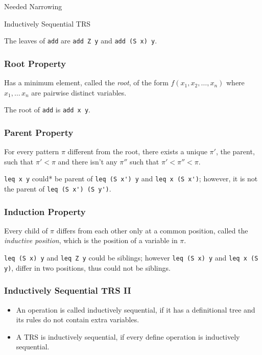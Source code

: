 \documentclass{beamer}
\begin{document}
\begin{section}{Needed Narrowing}
\begin{subsection}{Inductively Sequential TRS}
\begin{frame}
\begin{example}
  The leaves of \verb|add| are \verb|add Z y| and \verb|add (S x) y|.
\end{example}
\end{frame}
\begin{frame}
[fragile]
\frametitle{Root Property}
Has a minimum element, called the \textit{root}, of the form $f(x_1,x_2,\ldots,x_n)$ where $x_1,\ldots\,x_n$ are pairwise distinct variables.

\begin{example}
The root of \verb|add| is \verb|add x y|.

\end{example}
\end{frame}
\begin{frame}
[fragile]
  \frametitle{Parent Property} For every pattern $\pi$ different from the root, there exists a unique $\pi'$, the parent, such that $\pi' < \pi$ and there isn't any $\pi''$ such that $\pi' < \pi'' < \pi$.

\begin{example}
  \verb|leq x y| could* be parent of \verb|leq (S x') y| and \verb|leq x (S x')|; however, it is not the parent of \verb|leq (S x') (S y')|.
\end{example}
\end{frame}
\begin{frame}
[fragile]
\frametitle{Induction Property} Every child of $\pi$ differs from each other only at a common position, called the \textit{inductive position}, which is the position of a variable in $\pi$.

\begin{example}
\verb|leq (S x) y| and \verb|leq Z y| could be siblings; however \verb|leq (S x) y| and \verb|leq x (S y)|, differ in two positions, thus could not be siblings.
\end{example}

\end{frame}
\begin{frame}
\frametitle{Inductively Sequential TRS II}
\begin{itemize}
\item An operation is called inductively sequential, if it has a definitional tree and its rules do not contain extra variables.
\item A TRS is inductively sequential, if every define operation is inductively sequential. 
\end{itemize}
\end{frame}


\end{subsection}
\end{section}
\end{document}
